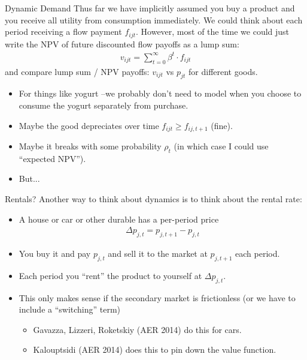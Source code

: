 \documentclass[aspectratio=169,11pt]{beamer}
\begin{document}
\begin{frame}{Dynamic Demand}
Thus far we have implicitly assumed you buy a product and you receive all utility from consumption immediately. We could think about each period receiving a \alert{flow payment} $f_{ijt}$. However, most of the time we could just write the NPV of future discounted flow payoffs as a \alert{lump sum}:
\begin{align*}
v_{ijt} = \sum_{t=0}^{\infty} \beta^t \cdot f_{ijt}
\end{align*}
and compare lump sum / NPV payoffs: $v_{ijt}$ vs $p_{jt}$ for different goods.
\begin{itemize}
\item For things like yogurt --we probably don't need to model when you choose to consume the yogurt separately from purchase.
\item Maybe the good depreciates over time $f_{ijt} \geq f_{ij,t+1}$ (fine).
\item Maybe it breaks with some probability $\rho_t$ (in which case I could use ``expected NPV'').
\item But...
\end{itemize}
\end{frame}



\begin{frame}{Rentals?}
Another way to think about dynamics is to think about the rental rate:
\begin{itemize}
\item A house or car or other durable has a per-period price
\begin{align*}
\Delta p_{j,t}=p_{j,t+1} - p_{j,t}
\end{align*}
\item You buy it and pay $p_{j,t}$ and sell it to the market at $p_{j,t+1}$ each period.
\item Each period you ``rent'' the product to yourself at $\Delta p_{j,t}$.
\item This only makes sense if the secondary market is frictionless (or we have to include a ``switching'' term)
\begin{itemize}
	\item Gavazza, Lizzeri, Roketskiy (AER 2014) do this for cars.
	\item Kalouptsidi (AER 2014) does this to pin down the value function.
\end{itemize}
\end{itemize}
\end{frame}
\end{document}
